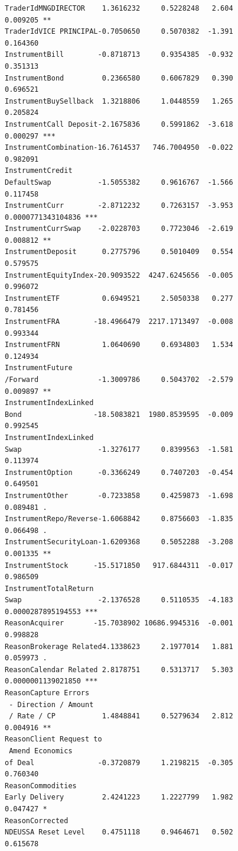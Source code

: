 \documentclass{DissertateUSU}
\begin{document}
\begin{verbatim}
TraderIdMNGDIRECTOR    1.3616232     0.5228248   2.604           0.009205 ** 
TraderIdVICE PRINCIPAL-0.7050650     0.5070382  -1.391           0.164360    
InstrumentBill        -0.8718713     0.9354385  -0.932           0.351313    
InstrumentBond         0.2366580     0.6067829   0.390           0.696521    
InstrumentBuySellback  1.3218806     1.0448559   1.265           0.205824    
InstrumentCall Deposit-2.1675836     0.5991862  -3.618           0.000297 ***
InstrumentCombination-16.7614537   746.7004950  -0.022           0.982091    
InstrumentCredit
DefaultSwap           -1.5055382     0.9616767  -1.566           0.117458    
InstrumentCurr        -2.8712232     0.7263157  -3.953 0.0000771343104836 ***
InstrumentCurrSwap    -2.0228703     0.7723046  -2.619           0.008812 ** 
InstrumentDeposit      0.2775796     0.5010409   0.554           0.579575    
InstrumentEquityIndex-20.9093522  4247.6245656  -0.005           0.996072    
InstrumentETF          0.6949521     2.5050338   0.277           0.781456    
InstrumentFRA        -18.4966479  2217.1713497  -0.008           0.993344    
InstrumentFRN          1.0640690     0.6934803   1.534           0.124934    
InstrumentFuture
/Forward              -1.3009786     0.5043702  -2.579           0.009897 ** 
InstrumentIndexLinked
Bond                 -18.5083821  1980.8539595  -0.009           0.992545    
InstrumentIndexLinked
Swap                  -1.3276177     0.8399563  -1.581           0.113974    
InstrumentOption      -0.3366249     0.7407203  -0.454           0.649501    
InstrumentOther       -0.7233858     0.4259873  -1.698           0.089481 .  
InstrumentRepo/Reverse-1.6068842     0.8756603  -1.835           0.066498 .  
InstrumentSecurityLoan-1.6209368     0.5052288  -3.208           0.001335 ** 
InstrumentStock      -15.5171850   917.6844311  -0.017           0.986509    
InstrumentTotalReturn
Swap                  -2.1376528     0.5110535  -4.183 0.0000287895194553 ***
ReasonAcquirer       -15.7038902 10686.9945316  -0.001           0.998828    
ReasonBrokerage Related4.1338623     2.1977014   1.881           0.059973 .  
ReasonCalendar Related 2.8178751     0.5313717   5.303 0.0000001139021850 ***
ReasonCapture Errors
 - Direction / Amount
 / Rate / CP           1.4848841     0.5279634   2.812           0.004916 ** 
ReasonClient Request to
 Amend Economics 
of Deal               -0.3720879     1.2198215  -0.305           0.760340    
ReasonCommodities
Early Delivery         2.4241223     1.2227799   1.982           0.047427 *  
ReasonCorrected 
NDEUSSA Reset Level    0.4751118     0.9464671   0.502           0.615678    

\end{verbatim}
\end{document}
